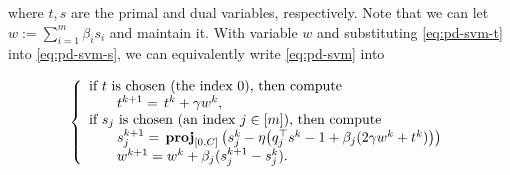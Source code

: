 {where $t,s$ are the primal and dual variables, respectively. Note that we can let $w:=\sum_{i=1}^m \beta_i s_i$ and maintain it. With variable $w$ and substituting \eqref{eq:pd-svm-t} into \eqref{eq:pd-svm-s}, we can equivalently write \eqref{eq:pd-svm} into

\begin{equation}
{\left\{
\begin{array}{l}
\text{if }t\text{ is chosen (the index 0), then compute}\\
\qquad t^{k+1}=\,t^k+\gamma w^k,\\
\text{if }s_j\text{ is chosen (an index $j \in [m]$), then compute}\\
\qquad s_j^{k+1}=\,\prj_{[0,C]}\left(s_j^k-\eta\big(q_j^\top s^k-1+\beta_j(2\gamma w^k+t^k)\big)\right)\\
\qquad w^{k+1}= w^k + \beta_j (s_j^{k+1} - s_j^k).
\end{array}
\right.
}\end{equation}



}
